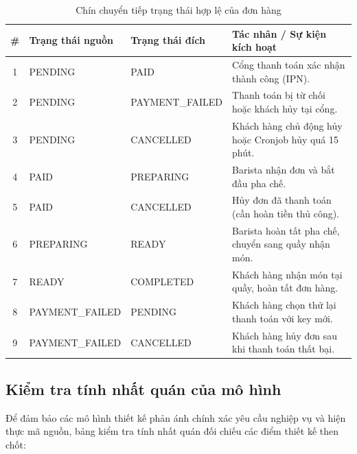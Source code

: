 \begin{table}[H]
\centering\small
\caption{Chín chuyển tiếp trạng thái hợp lệ của đơn hàng}
\label{tab:order-transitions}
\begin{tabularx}{\textwidth}{@{}c p{3.2cm} p{3.2cm} X@{}}
\toprule
\textbf{\#} & \textbf{Trạng thái nguồn} & \textbf{Trạng thái đích} & \textbf{Tác nhân / Sự kiện kích hoạt} \\
\midrule
1 & PENDING & PAID & Cổng thanh toán xác nhận thành công (IPN). \\
2 & PENDING & PAYMENT\_FAILED & Thanh toán bị từ chối hoặc khách hủy tại cổng. \\
3 & PENDING & CANCELLED & Khách hàng chủ động hủy hoặc Cronjob hủy quá 15 phút. \\
4 & PAID & PREPARING & Barista nhận đơn và bắt đầu pha chế. \\
5 & PAID & CANCELLED & Hủy đơn đã thanh toán (cần hoàn tiền thủ công). \\
6 & PREPARING & READY & Barista hoàn tất pha chế, chuyển sang quầy nhận món. \\
7 & READY & COMPLETED & Khách hàng nhận món tại quầy, hoàn tất đơn hàng. \\
8 & PAYMENT\_FAILED & PENDING & Khách hàng chọn thử lại thanh toán với key mới. \\
9 & PAYMENT\_FAILED & CANCELLED & Khách hàng hủy đơn sau khi thanh toán thất bại. \\
\bottomrule
\end{tabularx}
\end{table}

\subsection{Kiểm tra tính nhất quán của mô hình}

Để đảm bảo các mô hình thiết kế phản ánh chính xác yêu cầu nghiệp vụ và hiện thực mã nguồn, bảng kiểm tra tính nhất quán đối chiếu các điểm thiết kế then chốt:

